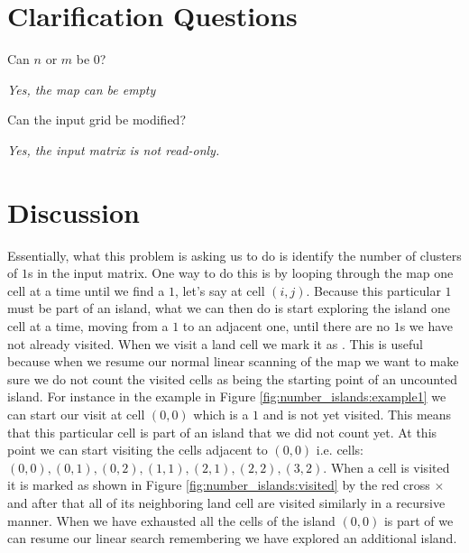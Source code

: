 \section{Clarification Questions}

\begin{QandA}
	\begin{questionitem} \begin{question} Can $n$ or $m$ be $0$?  \end{question} 	 
    \begin{answered}
		\textit{Yes, the map can be empty}
	\end{answered} \end{questionitem}
	\begin{questionitem} \begin{question} Can the input grid be modified?  \end{question} 	 
    \begin{answered}
		\textit{Yes, the input matrix is not read-only.}
	\end{answered} \end{questionitem}
\end{QandA}

\section{Discussion}
\label{number_islands:sec:discussion}
Essentially, what  this problem is asking us to do is identify the number of clusters of $1$s in the input matrix.
One way to do this is by looping through the map one cell at a time until we find a $1$, let's say at cell $(i,j)$.
Because this particular $1$ must be part of an island, what we can then do is start exploring the island
one cell at a time, moving from a $1$ to an adjacent one, until there are no $1$s we have not already visited.
When we visit a land cell we mark it as .
This is useful because when we resume our normal linear scanning of the map we want to make
sure we do not count the visited cells as being the starting point of an uncounted island.
For instance in the example in Figure \ref{fig:number_islands:example1} we can start our visit
at cell $(0,0)$ which is a $1$ and is not yet visited. This means that this particular cell is
part of an island that we did not count yet. At this point we can start visiting the cells adjacent
to $(0,0)$ i.e. cells: $(0,0), (0,1), (0,2), (1,1), (2,1), (2,2), (3,2)$. When a cell is visited it is
marked as shown in Figure  \ref{fig:number_islands:visited} by the red cross
\textcolor[HTML]{860000}{$\times$} and after that all of its neighboring land cell are visited similarly in a recursive manner.
When we have exhausted all the cells of the island $(0,0)$ is part of we can resume our linear search remembering we have explored an additional island.

